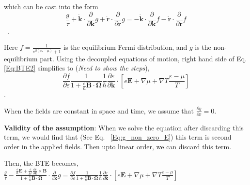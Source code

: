 \documentclass[aps,pra,amsmath,amssymb,floatfix,twocolumn, amsmath, superscriptaddress, twocolumn]{revtex4-2}
\newcommand{\bvec}[1]{{\mathbf #1}}
\begin{document}
which can be cast into the form
\begin{equation}
	\frac{g}{\tau} + \dot{\bvec{k}}\cdot\frac{\partial}{\partial \bvec{k}} g + \dot{\bvec{r}}\cdot\frac{\partial}{\partial \bvec{r}} g = -\dot{\bvec{k}}\cdot\frac{\partial}{\partial \bvec{k}}f - \dot{\bvec{r}}\cdot\frac{\partial}{\partial \bvec{r}}f
\end{equation}~\label{Eq:BTE2}.

Here $f = \frac{1}{e^{\beta(\varepsilon_{\bvec{k}} - \mu)} + 1}$ is the equilibrium Fermi distribution, and $g$ is the non-equilibrium part.
Using the decoupled equations of motion, right hand side of Eq. \eqref{Eq:BTE2} simplifies to (\textit{Need to show the steps}),
$$\frac{\partial f}{\partial \varepsilon}\frac{1}{1 + \frac{e}{\hbar} \bvec{B}\cdot\bvec{\Omega}}
\frac{1}{\hbar} \frac{\partial \varepsilon}{\partial \bvec{k}}\cdot\left[e \bvec{E} + \nabla{\mu} + \nabla T \frac{\varepsilon - \mu}{T}\right]
$$.

When the fields are constant in space and time, we assume that $\frac{\partial{g}}{\partial \bvec{r}} = 0$.

\textbf{Validity of the assumption}: When we solve the equation after discarding this term, we would find that (See Eq. ~\eqref{Eq:g_non_zero_E}) this term is second order in the applied fields. Then upto linear order, we can discard this term.

Then, the BTE becomes,
$\frac{g}{\tau} -\frac{\frac{e}{\hbar} \bvec{E} +\frac{e}{\hbar^2} \frac{\partial \varepsilon}{\partial \bvec{k}} \times \bvec{B}}{1 + \frac{e}{\hbar} \bvec{B}\cdot\bvec{\Omega}} \cdot\frac{\partial}{\partial \bvec{k}} g = \frac{\partial f}{\partial \varepsilon}\frac{1}{1 + \frac{e}{\hbar} \bvec{B}\cdot\bvec{\Omega}}
\frac{1}{\hbar} \frac{\partial \varepsilon}{\partial \bvec{k}}\cdot\left[e \bvec{E} + \nabla{\mu} + \nabla T \frac{\varepsilon - \mu}{T}\right] $

\end{document}
